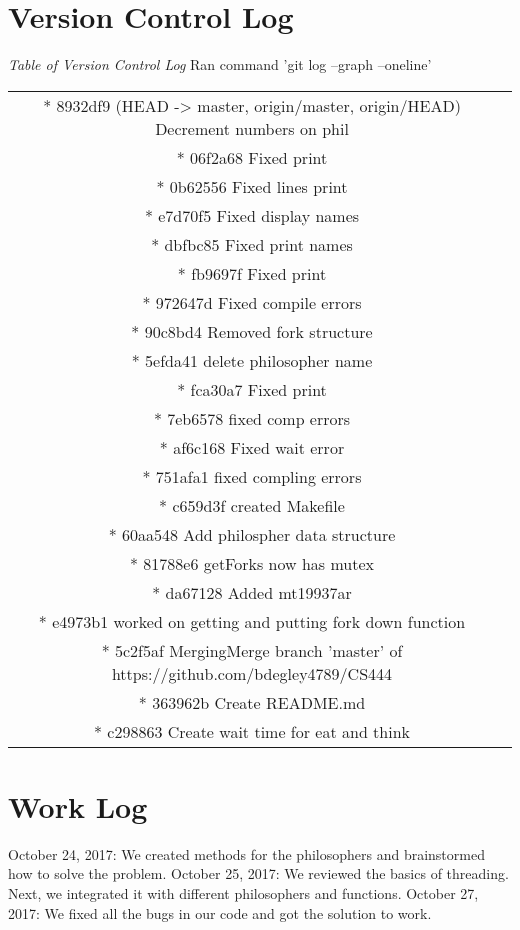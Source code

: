 \documentclass{article}
\begin{document}
\section*{Version Control Log}
\textit{Table of Version Control Log} Ran command 'git log --graph --oneline'
\newline
\begin{center}
\begin{tabular}{ c c }
* 8932df9 (HEAD -> master, origin/master, origin/HEAD) Decrement numbers on phil \\
* 06f2a68 Fixed print \\
* 0b62556 Fixed lines print \\
* e7d70f5 Fixed display names \\
* dbfbc85 Fixed print names \\
* fb9697f Fixed print \\
* 972647d Fixed compile errors \\
* 90c8bd4 Removed fork structure \\
* 5efda41 delete philosopher name \\
* fca30a7 Fixed print \\
* 7eb6578 fixed comp errors \\
* af6c168 Fixed wait error \\
* 751afa1 fixed compling errors \\
* c659d3f created Makefile \\
* 60aa548 Add philospher data structure \\
* 81788e6 getForks now has mutex \\
* da67128 Added mt19937ar \\
* e4973b1 worked on getting and putting fork down function \\
*   5c2f5af MergingMerge branch 'master' of https://github.com/bdegley4789/CS444 \\
* 363962b Create README.md \\
* c298863 Create wait time for eat and think \\
\end{tabular}
\end{center}

\section*{Work Log}
October 24, 2017: We created methods for the philosophers and brainstormed how to solve the problem.
\newline
October 25, 2017: We reviewed the basics of threading. Next, we integrated it with different philosophers and functions.
\newline
October 27, 2017: We fixed all the bugs in our code and got the solution to work.

\end{document}
